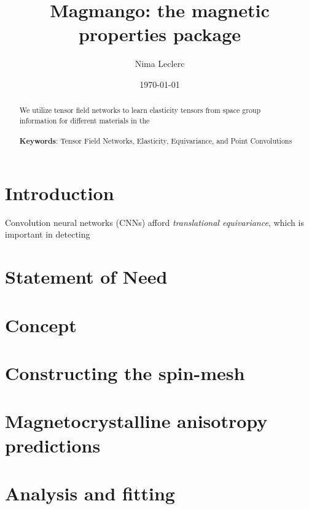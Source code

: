 \documentclass{article}
\title{Magmango: the magnetic properties package}
\author{Nima Leclerc}
\date{\today}
\begin{document}
\maketitle
\begin{abstract}
\justifying
We utilize tensor field networks to learn elasticity tensors from space group information for different materials in the 
\\
\\
\textbf{Keywords}: Tensor Field Networks, Elasticity, Equivariance, and Point Convolutions
\end{abstract}

\section*{Introduction}
\justifying
Convolution neural networks (CNNs) afford \textit{translational equivariance}, which is important in detecting 

\section*{Statement of Need}
\justifying


\section*{Concept}
\justifying



\section*{Constructing the spin-mesh}
\justifying


\section*{Magnetocrystalline anisotropy predictions} 
\justifying



\section*{Analysis and fitting} 
\justifying
\end{document}
